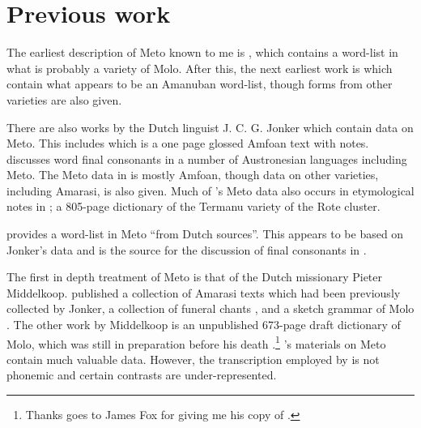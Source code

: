 \section{Previous work}\label{sec:PreWor}
The earliest description of Meto known to me is \cite{mu57},
which contains a word-list in what is probably a variety of Molo.
After this, the next earliest work is \cite{kl94}
which contain what appears to be an Amanuban word-list,
though forms from other varieties are also given.

There are also works by the Dutch linguist
J. C. G. Jonker which contain data on Meto.
This includes \cite[270f]{jo04} which is a one page
glossed Amfo{\Q}an text with notes.
\cite{jo06} discusses word final consonants in a number of
Austronesian languages including Meto.
The Meto data in \cite{jo06} is mostly Amfo{\Q}an, though data on
other varieties, including Amarasi, is also given.
Much of \citeauthor{jo06}'s Meto data also
occurs in etymological notes in \cite{jo08};
a 805-page dictionary of the Termanu variety of the Rote cluster.

\cite{ca44} provides a word-list in Meto ``from Dutch sources''.
This appears to be based on Jonker's data
and \cite{jo06} is the source for
the discussion of final consonants in \cite[29]{ca44c}.

The first in depth treatment of Meto is that
of the Dutch missionary Pieter Middelkoop.
\citeauthor{mi39} published a collection of Amarasi texts \citep{mi39}
which had been previously collected by Jonker, a collection
of funeral chants \citep{mi49}, and a sketch grammar of Molo \citep{mi50}.
The other work by Middelkoop is an unpublished 673-page draft dictionary of Molo,
which was still in preparation before his death \citep{mi72}.\footnote{
		Thanks goes to James Fox for giving me his copy of \cite{mi72}.}
\citeauthor{mi39}'s materials on Meto contain much valuable data.
However, the transcription employed by \citeauthor{mi39} is not phonemic
and certain contrasts are under-represented.
%

